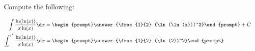 \documentclass{ximera}
\author{Jim Talamo}
\begin{document}
\begin{exercise}
Compute the following:

\begin{align*}
\int \frac{\ln(\ln(x))}{x\ln(x)} \d x &=
\begin{prompt}\answer{\frac{1}{2} (\ln(\ln(x)))^2}\end{prompt}+C \\
\int_e^{e^2} \frac{\ln(\ln(x))}{x\ln(x)} \d x &=\begin{prompt}\answer{\frac{1}{2} (\ln(2))^2}\end{prompt}
\end{align*}
\end{exercise}
\end{document}
